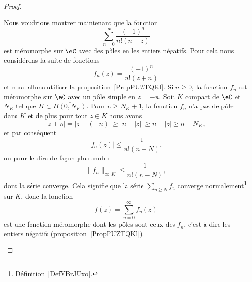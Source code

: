 \begin{proof}
\begin{subproof}
		 Nous voudrions montrer maintenant que la fonction
		\begin{equation}
			\sum_{n=0}^{\infty}\frac{ (-1)^n }{ n!(n-z) }
		\end{equation}
		est méromorphe sur \( \eC\) avec des pôles en les entiers négatifs. Pour cela nous considérons la suite de fonctions
		\begin{equation}
			f_n(z)=\frac{ (-1)^n }{ n!(z+n) }
		\end{equation}
		et nous allons utiliser la proposition~\ref{PropPUZTQKl}. Si \( n\geq 0\), la fonction \( f_n\) est méromorphe sur \( \eC\) avec un pôle simple en \( z=-n\). Soit \( K\) compact de \( \eC\) et \( N_K\) tel que \( K\subset\overline{ B(0,N_K) }\). Pour \( n\geq N_K+1\), la fonction \( f_n\) n'a pas de pôle dans \( K\) et de plus pour tout \( z\in K\) nous avons
		\begin{equation}
			| z+n |=| z-(-n) |\geq\big| n-| z | \big|\geq n-| z |\geq n-N_K,
		\end{equation}
		et par conséquent
		\begin{equation}
			| f_n(z) |\leq \frac{1}{ n!(n-N) },
		\end{equation}
		ou pour le dire de façon plus snob :
		\begin{equation}
			\| f_n \|_{\infty,K}\leq \frac{1}{ n!(n-N) },
		\end{equation}
		dont la série converge. Cela signifie que la série \( \sum_{n\geq N}f_n\) converge normalement\footnote{Définition~\ref{DefVBrJUxo}.} sur \( K\), donc la fonction
		\begin{equation}
			f(z)=\sum_{n=0}^{\infty}f_n(z)
		\end{equation}
		est une fonction méromorphe dont les pôles sont ceux des \( f_n\), c'est-à-dire les entiers négatifs (proposition~\ref{PropPUZTQKl}).



\end{subproof}
\end{proof}
